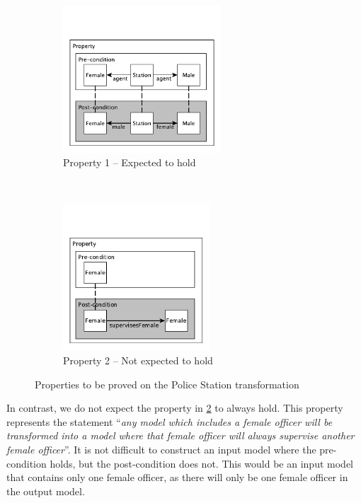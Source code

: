 \begin{figure}[thb]
        \centering
        \begin{subfigure}[b]{0.45\textwidth}
                \centering
                \includegraphics[height=5.5cm]{./figures/policestation_dsltrans/property1.pdf}
                \caption{Property 1 -- Expected to hold}
                \label{fig:dsltrans_prop1}
        \end{subfigure}%
        ~~
        \begin{subfigure}[b]{0.45\textwidth}
                \centering
                \includegraphics[height=5.5cm]{./figures/policestation_dsltrans/property2.pdf}
                \caption{Property 2 -- Not expected to hold}
                \label{fig:dsltrans_prop2}
        \end{subfigure}%
        \caption{ Properties to be proved on the Police Station transformation}
        \label{fig:properties}
\end{figure}

In contrast, we do not expect the property in \cref{fig:dsltrans_prop2} to always hold. This property represents the statement ``\emph{any model which includes a
female officer will be transformed into a model where that female officer will
always supervise another female officer}''. It is not difficult to construct an input model where the pre-condition holds, but the post-condition does not. This would be an input model that contains only one female officer, as there will only be one female officer in the output model.

